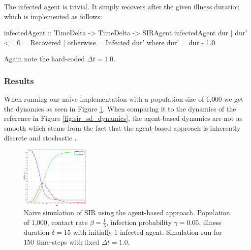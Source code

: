 The infected agent is trivial. It simply recovers after the given illness duration which is implemented as follows:

\begin{HaskellCode}
infectedAgent :: TimeDelta -> TimeDelta -> SIRAgent
infectedAgent dur
    | dur' <= 0 = Recovered
    | otherwise = Infected dur'
  where
    dur' = dur - 1.0  
\end{HaskellCode}

Again note the hard-coded $\Delta t = 1.0$.

\subsubsection{Results}
When running our naive implementation with a population size of 1,000 we get the dynamics as seen in Figure \ref{fig:sir_abs_dynamics_naive}. When comparing it to the dynamics of the reference in Figure \ref{fig:sir_sd_dynamics}, the agent-based dynamics are not as smooth which stems from the fact that the agent-based approach is inherently discrete and stochastic \cite{macal_agent-based_2010}.

\begin{figure}
	\centering
	\includegraphics[width=0.30\textwidth, angle=0]{./fig/step1_randmonad/SIR_1000agents_150t_1dt.png}
	\caption{Naive simulation of SIR using the agent-based approach. Population of 1,000, contact rate $\beta = \frac{1}{5}$, infection probability $\gamma = 0.05$, illness duration $\delta = 15$ with initially 1 infected agent. Simulation run for 150 time-steps with fixed $\Delta t = 1.0$.}
	\label{fig:sir_abs_dynamics_naive}
\end{figure}

    	
